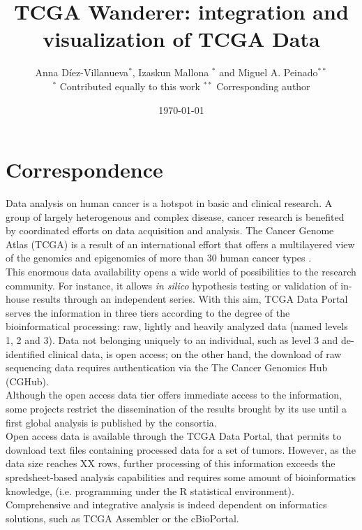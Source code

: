 \documentclass{article}
\title{TCGA Wanderer: integration and visualization of TCGA Data}
\author{Anna D{\'i}ez-Villanueva$^*$, Izaskun Mallona $^*$ and Miguel A. Peinado$^{**}$ \\
\vspace{3cm}
 $^*$ Contributed equally to this work
 $^{**}$ Corresponding author
}
\date{\today}
\begin{document}
\maketitle

\section{Correspondence}

Data analysis on human cancer is a hotspot in basic and clinical research. A group of largely heterogenous and complex disease, cancer research is benefited by coordinated efforts on data acquisition and analysis. The Cancer Genome Atlas (TCGA) is a result of an international effort that offers a multilayered view of the genomics and epigenomics of more than 30 human cancer types \cite{weinstein2013cancer}.\\

This enormous data availability opens a wide world of possibilities to the research community. For instance, it allows \textit{in silico} hypothesis testing or validation of in-house results through an independent series. With this aim, TCGA Data Portal serves the information in three tiers according to the degree of the bioinformatical processing: raw, lightly and heavily analyzed data (named levels 1, 2 and 3). Data not belonging uniquely to an individual, such as level 3 and de-identified clinical data, is open access; on the other hand, the download of raw sequencing data requires authentication via the The Cancer Genomics Hub (CGHub)\cite{wilks2014cancer}.\\ 

Although the open access data tier offers immediate access to the information, some projects restrict the dissemination of the results brought by its use until a first global analysis is published by the consortia.\\

Open access data is available through the TCGA Data Portal\cite{zhang2011international}, that permits to download text files containing processed data for a set of tumors. However, as the data size reaches XX rows, further processing of this information exceeds the spredsheet-based analysis capabilities and requires some amount of bioinformatics knowledge, (i.e. programming under the R statistical environment). Comprehensive and integrative analysis is indeed dependent on informatics solutions, such as TCGA Assembler\cite{zhu2014tcga} or the cBioPortal\cite{gao2013integrative}.\\
\end{document}
